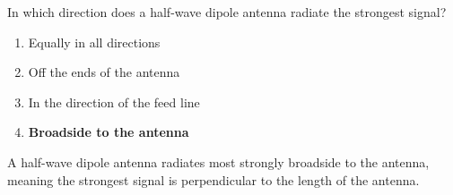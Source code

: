 \begin{tcolorbox}[colback=gray!10!white,colframe=black!75!black,title={T9A10}]
    In which direction does a half-wave dipole antenna radiate the strongest signal?
    \begin{enumerate}[label=\Alph*),noitemsep]
        \item Equally in all directions
        \item Off the ends of the antenna
        \item In the direction of the feed line
        \item \textbf{Broadside to the antenna}
    \end{enumerate}
\end{tcolorbox}
A half-wave dipole antenna radiates most strongly broadside to the antenna, meaning the strongest signal is perpendicular to the length of the antenna.
